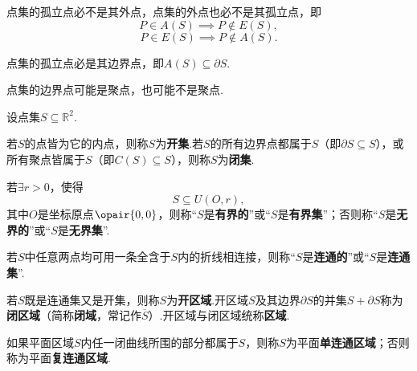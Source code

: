 \begin{property}
点集的孤立点必不是其外点，点集的外点也必不是其孤立点，即\[
P \in A(S) \implies P \notin E(S),
\]\[
P \in E(S) \implies P \notin A(S).
\]
\end{property}

\begin{property}
点集的孤立点必是其边界点，即\(A(S) \subseteq \partial{S}\).
\end{property}

\begin{property}
点集的边界点可能是聚点，也可能不是聚点.
\end{property}

\begin{definition}
设点集\(S \subseteq \mathbb{R}^2\).

若\(S\)的点皆为它的内点，则称\(S\)为\textbf{开集}.若\(S\)的所有边界点都属于\(S\)（即\(\partial S \subseteq S\)），或所有聚点皆属于\(S\)（即\(C(S) \subseteq S\)），则称\(S\)为\textbf{闭集}.

若\(\exists r > 0\)，使得\[
S \subseteq U(O,r),
\]其中\(O\)是坐标原点\(\opair{0,0}\)，则称“\(S\)是\textbf{有界的}”或“\(S\)是\textbf{有界集}”；否则称“\(S\)是\textbf{无界的}”或“\(S\)是\textbf{无界集}”.

若\(S\)中任意两点均可用一条全含于\(S\)内的折线相连接，则称“\(S\)是\textbf{连通的}”或“\(S\)是\textbf{连通集}”.

若\(S\)既是连通集又是开集，则称\(S\)为\textbf{开区域}.开区域\(S\)及其边界\(\partial S\)的并集\(S + \partial S\)称为\textbf{闭区域}（简称\textbf{闭域}，常记作\(\overline{S}\)）.开区域与闭区域统称\textbf{区域}.

如果平面区域\(S\)内任一闭曲线所围的部分都属于\(S\)，则称\(S\)为平面\textbf{单连通区域}；否则称为平面\textbf{复连通区域}.
\end{definition}
